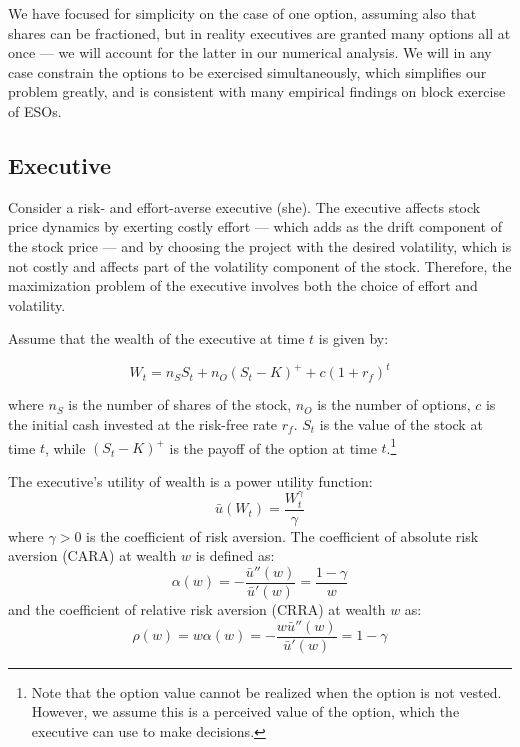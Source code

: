 We have focused for simplicity on the case of one option, assuming also that shares can be fractioned, but in reality executives are granted many options all at once --- we will account for the latter in our numerical analysis. We will in any case constrain the options to be exercised simultaneously, which simplifies our problem greatly, and is consistent with many empirical findings on block exercise of ESOs.



\subsection{Executive}
Consider a risk- and effort-averse executive (she). The executive affects stock price dynamics by exerting costly effort --- which adds as the drift component of the stock price --- and by choosing the project with the desired volatility, which is not costly and affects part of the volatility component of the stock. Therefore, the maximization problem of the executive involves both the choice of effort and volatility. 

Assume that the wealth of the executive at time $t$ is given by: 

$$ W_t = n_S S_t + n_O (S_t-K)^+ + c(1+r_f)^t   $$ 

where $n_S$ is the number of shares of the stock, $n_O$ is the number of options, $c$ is the initial cash invested at the risk-free rate $r_f$. $S_t$ is the value of the stock at time $t$, while $(S_t-K)^+$ is the payoff of the option at time $t$.\footnote{Note that the option value cannot be realized when the option is not vested. However, we assume this is a perceived value of the option, which the executive can use to make decisions.}

The executive's utility of wealth is a power utility function:
$$ \bar{u}(W_t) = \frac{W_t^{\gamma}}{\gamma} $$
where $\gamma > 0$ is the coefficient of risk aversion. The coefficient of absolute risk aversion (CARA) at wealth $w$ is defined as:
$$ \alpha(w) = -\frac{\bar{u}''(w)}{\bar{u}'(w)} = \frac{1-\gamma}{w} $$
and the coefficient of relative risk aversion (CRRA) at wealth $w$ as:
$$ \rho(w) = w \alpha(w) = -\frac{w\bar{u}''(w)}{\bar{u}'(w)} = 1-\gamma $$

